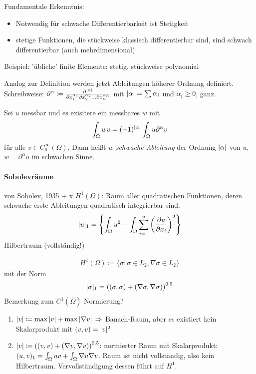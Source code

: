 Fundamentale Erkenntnis:
\begin{itemize}
\item Notwendig für schwache Differentierbarkeit ist Stetigkeit
\item stetige Funktionen, die stückweise klassisch differentierbar sind, sind schwach differentierbar (auch mehrdimensional)
\end{itemize}

Beispiel: 'übliche' finite Elemente: stetig, stückweise polynomial

Analog zur Definition werden jetzt Ableitungen höherer Ordnung definiert. Schreibweise: $\partial^\alpha \coloneqq \frac{\partial^{|\alpha|}}{\partial x_1^{\alpha_1} \partial x_2^{\alpha_2} \dots \partial x_n^{\alpha_n}}$ mit $|\alpha| = \sum \alpha_i$ und $\alpha_i \geq 0$, ganz.

\begin{definition}
  Sei $u$ messbar und es exisitere ein messbares $w$ mit 
  \begin{align*}
    \int_\Omega w v = (-1)^{|\alpha|} \int_\Omega u \partial^\alpha v
  \end{align*}
für alle $v \in C^\infty_0(\Omega)$. Dann heißt $w$ \emph{schwache Ableitung} der Ordnung $| \alpha|$ von $u$, $w = \partial ^\alpha u$ im schwachen Sinne.
\end{definition}
\paragraph{Sobolevräume} von Sobolev, 1935 + x 
$H^1 (\Omega)$: Raum aller quadratischen Funktionen, deren schwache erste Ableitungen quadratisch integrierbar sind.
\begin{align*}
  |u|_1 = \left \{ \int_\Omega u^2 + \int_\Omega \sum_{i= 1}^n \left( \frac{\partial u}{\partial x_i}\right)^2 \right \}
\end{align*}
Hilbertraum (vollständig!)

\begin{align*}
  H^1(\Omega) \coloneqq \{ \sigma: \sigma \in L_2, \nabla \sigma \in L_2\}
\end{align*}
mit der Norm 
\begin{align*}
  |\sigma|_1 = \left( (\sigma, \sigma) + (\nabla \sigma, \nabla \sigma)\right)^{0.5}
\end{align*}
Bemerkung zum $C^1(\bar \Omega)$ Normierung? 
\begin{enumerate}
\item $|v| \coloneqq \max |v| + \max |\nabla v| \,  \Rightarrow$ Banach-Raum, aber es existiert kein Skalarprodukt mit $(v, v) = |v| ^2$
\item $|v| \coloneqq \left( (v,v) + (\nabla v, \nabla v)\right)^{0.5}$: normierter Raum mit Skalarprodukt: $(u,v)_1 = \int_\Omega uv + \int_\Omega \nabla u \nabla v$. Raum ist nicht vollständig, also kein Hilbertraum. Vervollständigung dessen führt auf $H^1$.
\end{enumerate}

